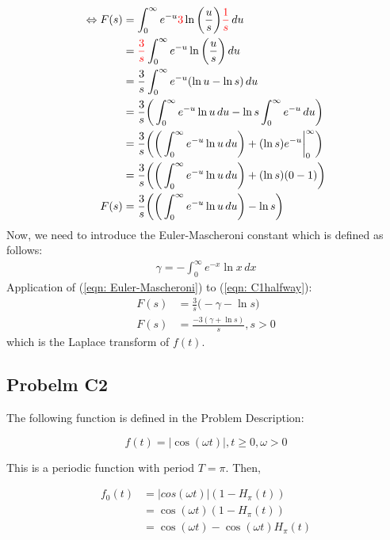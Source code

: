 \documentclass[a4paper,10pt,reqno]{amsart}
\numberwithin{equation}{section}
\begin{document}
\begin{align}
\Leftrightarrow F(s) &= \int_{0}^{\infty} e^{-u} \textcolor{red}{3}\ln \bigg(\frac{u}{s}\bigg) \textcolor{red}{\frac{1}{s}} \,du  \nonumber \\
&= \textcolor{red}{\frac{3}{s}} \int_{0}^{\infty} e^{-u} \ln \bigg(\frac{u}{s}\bigg) \,du  \nonumber \\
&= \frac{3}{s} \int_{0}^{\infty} e^{-u} (\ln u - \ln s) \,du  \nonumber \\
&= \frac{3}{s} \bigg( \int_{0}^{\infty} e^{-u} \ln u \,du - \ln s  \int_{0}^{\infty} e^{-u} \,du \bigg) \nonumber \\
&= \frac{3}{s} \bigg(\bigg( \int_{0}^{\infty} e^{-u} \ln u \,du \bigg) + (\ln s) e^{-u} \bigg|_0^\infty \bigg) \nonumber \\
&= \frac{3}{s} \bigg(\bigg( \int_{0}^{\infty} e^{-u} \ln u \,du \bigg) + (\ln s) (0-1) \bigg) \nonumber \\
F(s)&= \frac{3}{s} \bigg(\bigg( \int_{0}^{\infty} e^{-u} \ln u \,du \bigg) - \ln s \bigg) \label{eqn: C1halfway}
\end{align}
Now, we need to introduce the Euler-Mascheroni constant which is defined as follows:
\begin{align}
\gamma = -\int_{0}^{\infty} e^{-x} \ln x \,dx \label{eqn: Euler-Mascheroni}
\end{align}
Application of (\ref{eqn: Euler-Mascheroni}) to (\ref{eqn: C1halfway}):
\begin{align}
F(s) &= \frac{3}{s} \bigg( -\gamma - \ln s \bigg) \nonumber \\
F(s) &= \frac{-3(\gamma + \ln s)}{s}, s>0 \label{eqn: C1final}
\end{align}
which is the Laplace transform of $f(t)$.


\subsection{Probelm C2}\label{sec:c2}

The following function is defined in the Problem Description:

\begin{equation}
    f(t) = |\cos(\omega t)|, t \geq 0, \omega > 0
\end{equation}

This is a periodic function with period $T = \pi$. Then, 

\begin{align}
f_0(t) &= |cos(\omega t)|(1 - H_\pi(t)) \\
&= \cos(\omega t)(1 - H_\pi(t)) \\
&= \cos(\omega t) - \cos(\omega t)H_\pi(t)
\end{align}
\end{document}
